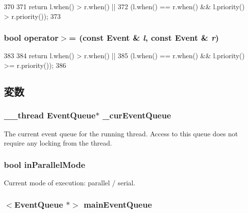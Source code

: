 \begin{DoxyCode}
370 {
371     return l.when() > r.when() ||
372         (l.when() == r.when() && l.priority() > r.priority());
373 }
\end{DoxyCode}
\hypertarget{eventq_8hh_a53cd3371f557c2fce6b6a65fc06d4d4e}{
\subsubsection[{operator$>$=}]{\setlength{\rightskip}{0pt plus 5cm}bool operator$>$= (const {\bf Event} \& {\em l}, \/  const {\bf Event} \& {\em r})}}
\label{eventq_8hh_a53cd3371f557c2fce6b6a65fc06d4d4e}



\begin{DoxyCode}
383 {
384     return l.when() > r.when() ||
385         (l.when() == r.when() && l.priority() >= r.priority());
386 }
\end{DoxyCode}


\subsection{変数}
\hypertarget{eventq_8hh_a2a77d1fcaf54c702b80ae9c02d588333}{
\subsubsection[{\_\-curEventQueue}]{\setlength{\rightskip}{0pt plus 5cm}\_\-\_\-thread {\bf EventQueue}$\ast$ {\bf \_\-curEventQueue}}}
\label{eventq_8hh_a2a77d1fcaf54c702b80ae9c02d588333}
The current event queue for the running thread. Access to this queue does not require any locking from the thread. \hypertarget{eventq_8hh_a1a48f421470ff3e6db2b119ab1286b96}{
\subsubsection[{inParallelMode}]{\setlength{\rightskip}{0pt plus 5cm}bool {\bf inParallelMode}}}
\label{eventq_8hh_a1a48f421470ff3e6db2b119ab1286b96}


Current mode of execution: parallel / serial. \hypertarget{eventq_8hh_a75c22a9e4871574133dae986c0a4527e}{
\subsubsection[{mainEventQueue}]{$<${\bf EventQueue} $\ast$$>$ {\bf mainEventQueue}}}
\label{eventq_8hh_a75c22a9e4871574133dae986c0a4527e}


